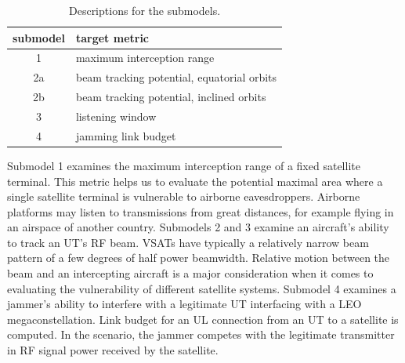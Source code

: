 \documentclass[english, 12pt, a4paper, elec, utf8, a-1b, online]{aaltothesis}
\begin{document}
\begin{table}[h]
  \centering
  \caption{Descriptions for the submodels.}
  \begin{tabular}{@{}cl@{}}
  \toprule
  \multicolumn{1}{l}{submodel}  & target metric                              \\ \midrule
  1                             & maximum interception range                 \\
  2a                            & beam tracking potential, equatorial orbits \\
  2b                            & beam tracking potential, inclined orbits   \\
  3                             & listening window                           \\
  4                             & jamming link budget                        \\ \bottomrule
  \end{tabular}
  \label{table-submodel-descriptions}
\end{table}

Submodel 1 examines the maximum interception range of a fixed satellite terminal.
This metric helps us to evaluate the potential maximal area where a single satellite terminal is vulnerable to airborne eavesdroppers.
Airborne platforms may listen to transmissions from great distances, for example flying in an airspace of another country.
Submodels 2 and 3 examine an aircraft's ability to track an UT's RF beam.
VSATs have typically a relatively narrow beam pattern of a few degrees of half power beamwidth.
Relative motion between the beam and an intercepting aircraft is a major consideration when it comes to evaluating the vulnerability of different satellite systems.
Submodel 4 examines a jammer's ability to interfere with a legitimate UT interfacing with a LEO megaconstellation.
Link budget for an UL connection from an UT to a satellite is computed.
In the scenario, the jammer competes with the legitimate transmitter in RF signal power received by the satellite.
\end{document}
